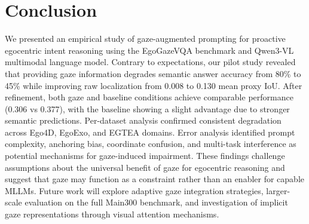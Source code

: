 \documentclass[11pt]{article}
\begin{document}
\section{Conclusion}
We presented an empirical study of gaze-augmented prompting for proactive egocentric intent reasoning using the EgoGazeVQA benchmark and Qwen3-VL multimodal language model. Contrary to expectations, our pilot study revealed that providing gaze information degrades semantic answer accuracy from 80\% to 45\% while improving raw localization from 0.008 to 0.130 mean proxy IoU. After refinement, both gaze and baseline conditions achieve comparable performance (0.306 vs 0.377), with the baseline showing a slight advantage due to stronger semantic predictions. Per-dataset analysis confirmed consistent degradation across Ego4D, EgoExo, and EGTEA domains. Error analysis identified prompt complexity, anchoring bias, coordinate confusion, and multi-task interference as potential mechanisms for gaze-induced impairment. These findings challenge assumptions about the universal benefit of gaze for egocentric reasoning and suggest that gaze may function as a constraint rather than an enabler for capable MLLMs. Future work will explore adaptive gaze integration strategies, larger-scale evaluation on the full Main300 benchmark, and investigation of implicit gaze representations through visual attention mechanisms.



\end{document}
